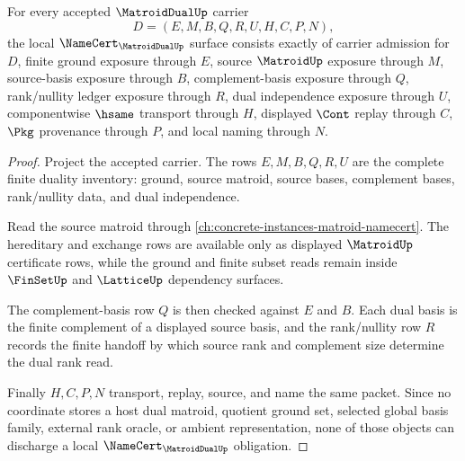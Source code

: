 \begin{theorem}
\label{thm:matroid-dual-namecert-obligations}
For every accepted $\MatroidDualUp$ carrier
$$
D=(E,M,B,Q,R,U,H,C,P,N),
$$
the local $\NameCert_{\MatroidDualUp}$ surface consists exactly of carrier admission for $D$, finite ground exposure through $E$, source $\MatroidUp$ exposure through $M$, source-basis exposure through $B$, complement-basis exposure through $Q$, rank/nullity ledger exposure through $R$, dual independence exposure through $U$, componentwise $\hsame$ transport through $H$, displayed $\Cont$ replay through $C$, $\Pkg$ provenance through $P$, and local naming through $N$.
\end{theorem}
\begin{proof}
Project the accepted carrier. The rows $E,M,B,Q,R,U$ are the complete finite duality inventory: ground, source matroid, source bases, complement bases, rank/nullity data, and dual independence.

Read the source matroid through \autoref{ch:concrete-instances-matroid-namecert}. The hereditary and exchange rows are available only as displayed $\MatroidUp$ certificate rows, while the ground and finite subset reads remain inside $\FinSetUp$ and $\LatticeUp$ dependency surfaces.

The complement-basis row $Q$ is then checked against $E$ and $B$. Each dual basis is the finite complement of a displayed source basis, and the rank/nullity row $R$ records the finite handoff by which source rank and complement size determine the dual rank read.

Finally $H,C,P,N$ transport, replay, source, and name the same packet. Since no coordinate stores a host dual matroid, quotient ground set, selected global basis family, external rank oracle, or ambient representation, none of those objects can discharge a local $\NameCert_{\MatroidDualUp}$ obligation.
\end{proof}

